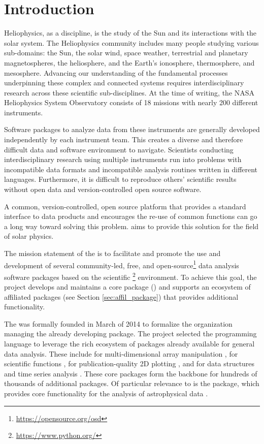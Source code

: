 \section{Introduction}
\label{sec:intro}

Heliophysics, as a discipline, is the study of the Sun and its interactions with the solar system.
The Heliophysics community includes many people studying various sub-domains: the Sun, the solar wind, space weather, terrestrial and planetary magnetospheres, the heliosphere, and the Earth's ionosphere, thermosphere, and mesosphere.
Advancing our understanding of the fundamental processes underpinning these complex and connected systems requires interdisciplinary research across these scientific sub-disciplines.
At the time of writing, the NASA Heliophysics System Observatory consists of 18 missions with nearly 200 different instruments.

Software packages to analyze data from these instruments are generally developed independently by each instrument team.
This creates a diverse and therefore difficult data and software environment to navigate.
Scientists conducting interdisciplinary research using multiple instruments run into problems with incompatible data formats and incompatible analysis routines written in different languages.
Furthermore, it is difficult to reproduce others' scientific results without open data and version-controlled open source software.

A common, version-controlled, open source platform that provides a standard interface to data products and encourages the re-use of common functions can go a long way toward solving this problem.
\sunpyproj aims to provide this solution for the field of solar physics.

The mission statement of the \sunpyproj is to facilitate and promote the use and development of several community-led, free, and open-source\footnote{\url{https://opensource.org/osd}} data analysis software packages based on the scientific \python\footnote{\url{https://www.python.org/}} environment.
To achieve this goal, the project develops and maintains a core package (\sunpypkg) and supports an ecosystem of affiliated packages (see Section \ref{sec:affil_package}) that provides additional functionality.

The \sunpyproj was formally founded in March of 2014 to formalize the organization managing the already developing \sunpypkg package.
The project selected the \python programming language to leverage the rich ecosystem of packages already available for general data analysis.
These include  for multi-dimensional array manipulation \citep{numpy},  for scientific functions \citep{scipy},  for publication-quality 2D plotting \citep{matplotlib}, and  for data structures and time series analysis \citep{pandas}.
These core packages form the backbone for hundreds of thousands of additional \python packages.
Of particular relevance to \sunpypkg is the \astropypkg package, which provides core functionality for the analysis of astrophysical data \citep{astropy2018}.

